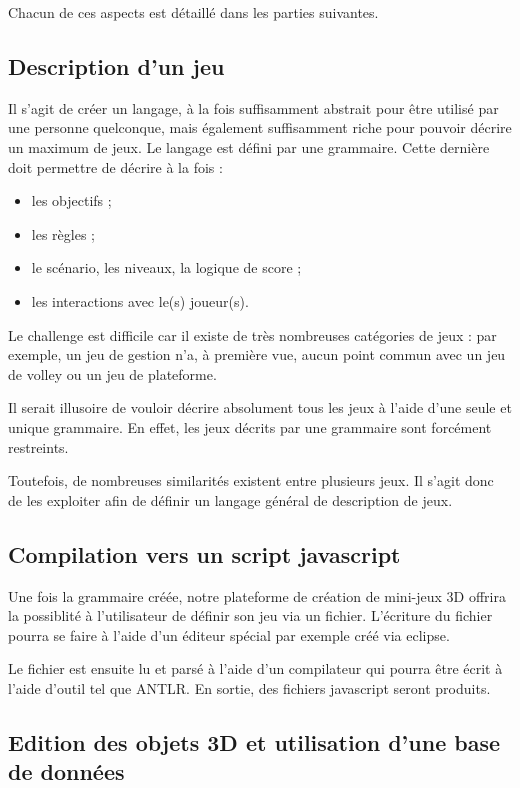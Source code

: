 Chacun de ces aspects est détaillé dans les parties suivantes.

\subsection{Description d'un jeu}

Il s'agit de créer un langage, à la fois suffisamment abstrait pour être utilisé par une personne quelconque, mais également suffisamment riche
pour pouvoir décrire un maximum de jeux.
Le langage est défini par une grammaire.
Cette dernière doit permettre de décrire à la fois :
\begin{itemize}
 \item les objectifs ;
 \item les règles ;
 \item le scénario, les niveaux, la logique de score ;
 \item les interactions avec le(s) joueur(s).
\end{itemize}


Le challenge est difficile car il existe de très nombreuses catégories de jeux : 
par exemple, un jeu de gestion n'a, à première vue, aucun point commun avec un jeu de volley ou un jeu de plateforme.

Il serait illusoire de vouloir décrire absolument tous les jeux à l'aide d'une seule et unique grammaire.
En effet, les jeux décrits par une grammaire sont forcément restreints.

Toutefois, de nombreuses similarités existent entre plusieurs jeux. Il s'agit donc de les exploiter afin de définir un langage général de description de jeux.

\subsection{Compilation vers un script javascript}

Une fois la grammaire créée, notre plateforme de création de mini-jeux 3D offrira la possiblité à l'utilisateur de définir son jeu via un fichier.
L'écriture du fichier pourra se faire à l'aide d'un éditeur spécial par exemple créé via eclipse.

Le fichier est ensuite lu et parsé à l'aide d'un compilateur qui pourra être écrit à l'aide d'outil tel que ANTLR.
En sortie, des fichiers javascript seront produits.

\subsection{Edition des objets 3D et utilisation d'une base de données}

